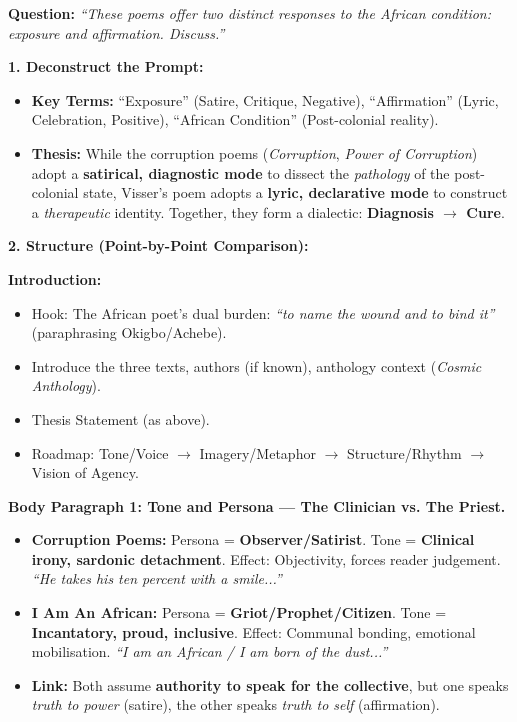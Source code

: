 \documentclass[11pt]{article}
\begin{document}
\begin{exoresolu}
\textbf{Question:} \emph{``These poems offer two distinct responses to the African condition: exposure and affirmation. Discuss.''}

\textbf{1. Deconstruct the Prompt:}
\begin{itemize}
    \item \textbf{Key Terms:} ``Exposure'' (Satire, Critique, Negative), ``Affirmation'' (Lyric, Celebration, Positive), ``African Condition'' (Post-colonial reality).
    \item \textbf{Thesis:} While the corruption poems (\emph{Corruption}, \emph{Power of Corruption}) adopt a \textbf{satirical, diagnostic mode} to dissect the \emph{pathology} of the post-colonial state, Visser's poem adopts a \textbf{lyric, declarative mode} to construct a \emph{therapeutic} identity. Together, they form a dialectic: \textbf{Diagnosis $\to$ Cure}.
\end{itemize}

\textbf{2. Structure (Point-by-Point Comparison):}

\textbf{Introduction:}
\begin{itemize}
    \item Hook: The African poet's dual burden: \emph{``to name the wound and to bind it''} (paraphrasing Okigbo/Achebe).
    \item Introduce the three texts, authors (if known), anthology context (\emph{Cosmic Anthology}).
    \item Thesis Statement (as above).
    \item Roadmap: Tone/Voice $\to$ Imagery/Metaphor $\to$ Structure/Rhythm $\to$ Vision of Agency.
\end{itemize}

\textbf{Body Paragraph 1: Tone and Persona — The Clinician vs. The Priest.}
\begin{itemize}
    \item \textbf{Corruption Poems:} Persona = \textbf{Observer/Satirist}. Tone = \textbf{Clinical irony, sardonic detachment}. Effect: Objectivity, forces reader judgement. \emph{``He takes his ten percent with a smile...''}
    \item \textbf{I Am An African:} Persona = \textbf{Griot/Prophet/Citizen}. Tone = \textbf{Incantatory, proud, inclusive}. Effect: Communal bonding, emotional mobilisation. \emph{``I am an African / I am born of the dust...''}
    \item \textbf{Link:} Both assume \textbf{authority to speak for the collective}, but one speaks \emph{truth to power} (satire), the other speaks \emph{truth to self} (affirmation).
\end{itemize}


\end{exoresolu}
\end{document}
